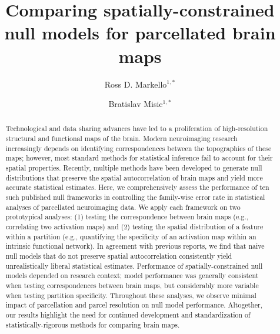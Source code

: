 \documentclass[12pt,aps,pra,reprint,showkeys]{revtex4-1}
\begin{document}
\title{Comparing spatially-constrained null models for parcellated brain maps}
\author{Ross D. Markello$^{1,*}$}
\author{Bratislav Misic$^{1,*}$}


\begin{abstract}
\noindent Technological and data sharing advances have led to a proliferation of high-resolution structural and functional maps of the brain.
Modern neuroimaging research increasingly depends on identifying correspondences between the topographies of these maps; however, most standard methods for statistical inference fail to account for their spatial properties.
Recently, multiple methods have been developed to generate null distributions that preserve the spatial autocorrelation of brain maps and yield more accurate statistical estimates.
Here, we comprehensively assess the performance of ten such published null frameworks in controlling the family-wise error rate in statistical analyses of parcellated neuroimaging data.
We apply each framework on two prototypical analyses: (1) testing the correspondence between brain maps (e.g., correlating two activation maps) and (2) testing the spatial distribution of a feature within a partition (e.g., quantifying the specificity of an activation map within an intrinsic functional network).
In agreement with previous reports, we find that naive null models that do not preserve spatial autocorrelation consistently yield unrealistically liberal statistical estimates.
Performance of spatially-constrained null models depended on research context; model performance was generally consistent when testing correspondences between brain maps, but considerably more variable when testing partition specificity.
Throughout these analyses, we observe minimal impact of parcellation and parcel resolution on null model performance.
Altogether, our results highlight the need for continued development and standardization of statistically-rigorous methods for comparing brain maps.

\end{abstract}

\end{document}
